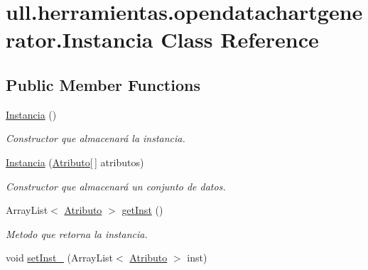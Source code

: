 \hypertarget{classull_1_1herramientas_1_1opendatachartgenerator_1_1_instancia}{}\section{ull.\+herramientas.\+opendatachartgenerator.\+Instancia Class Reference}
\label{classull_1_1herramientas_1_1opendatachartgenerator_1_1_instancia}
\subsection*{Public Member Functions}
\begin{DoxyCompactItemize}
\item 
\mbox{\label{classull_1_1herramientas_1_1opendatachartgenerator_1_1_instancia_a5fc12cecd02b493acbf3c67319c6689f}} 
\mbox{\hyperlink{classull_1_1herramientas_1_1opendatachartgenerator_1_1_instancia_a5fc12cecd02b493acbf3c67319c6689f}{Instancia}} ()
\begin{DoxyCompactList}\small\item\em Constructor que almacenará la instancia. \end{DoxyCompactList}\item 
\mbox{\hyperlink{classull_1_1herramientas_1_1opendatachartgenerator_1_1_instancia_a4dc5497b8b8bdb2d15540529ace77487}{Instancia}} (\mbox{\hyperlink{classull_1_1herramientas_1_1opendatachartgenerator_1_1_atributo}{Atributo}}\mbox{[}$\,$\mbox{]} atributos)
\begin{DoxyCompactList}\small\item\em Constructor que almacenará un conjunto de datos. \end{DoxyCompactList}\item 
Array\+List$<$ \mbox{\hyperlink{classull_1_1herramientas_1_1opendatachartgenerator_1_1_atributo}{Atributo}} $>$ \mbox{\hyperlink{classull_1_1herramientas_1_1opendatachartgenerator_1_1_instancia_a64e44135bff263df5459fc8c04457b37}{get\+Inst}} ()
\begin{DoxyCompactList}\small\item\em Metodo que retorna la instancia. \end{DoxyCompactList}\item 
void \mbox{\hyperlink{classull_1_1herramientas_1_1opendatachartgenerator_1_1_instancia_ad8bb48b409066a271d653a25d8826808}{set\+Inst\+\_\+}} (Array\+List$<$ \mbox{\hyperlink{classull_1_1herramientas_1_1opendatachartgenerator_1_1_atributo}{Atributo}} $>$ inst)

\end{DoxyCompactItemize}
